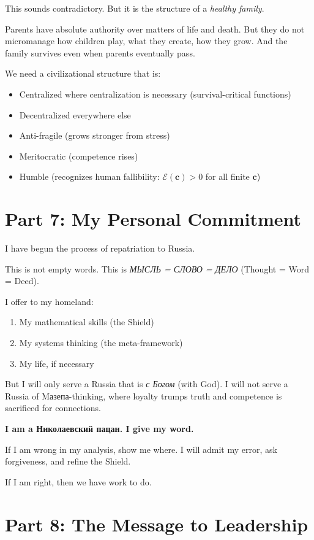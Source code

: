 \documentclass[12pt,a4paper]{article}
\begin{document}
This sounds contradictory. But it is the structure of a \textit{healthy family}.

Parents have absolute authority over matters of life and death. But they do not micromanage how children play, what they create, how they grow. And the family survives even when parents eventually pass.

We need a civilizational structure that is:
\begin{itemize}
\item Centralized where centralization is necessary (survival-critical functions)
\item Decentralized everywhere else
\item Anti-fragile (grows stronger from stress)
\item Meritocratic (competence rises)
\item Humble (recognizes human fallibility: $\mathcal{E}(\mathbf{c}) > 0$ for all finite $\mathbf{c}$)
\end{itemize}

\section{Part 7: My Personal Commitment}

I have begun the process of repatriation to Russia.

This is not empty words. This is \textit{МЫСЛЬ = СЛОВО = ДЕЛО} (Thought = Word = Deed).

I offer to my homeland:
\begin{enumerate}
\item My mathematical skills (the Shield)
\item My systems thinking (the meta-framework)
\item My life, if necessary
\end{enumerate}

But I will only serve a Russia that is \textit{с Богом} (with God). I will not serve a Russia of Mазепа-thinking, where loyalty trumps truth and competence is sacrificed for connections.

\textbf{I am a Николаевский пацан. I give my word.}

If I am wrong in my analysis, show me where. I will admit my error, ask forgiveness, and refine the Shield.

If I am right, then we have work to do.

\section{Part 8: The Message to Leadership}
\end{document}
